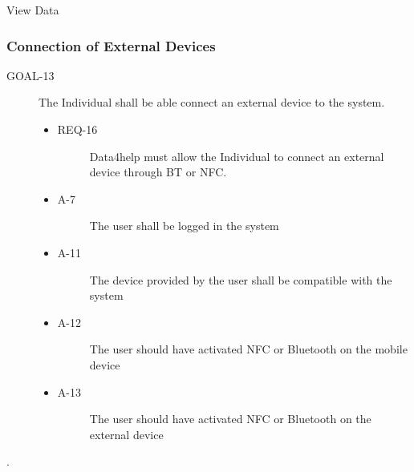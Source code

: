 \documentclass[a4paper]{article}
\newcommand{\requirement}{\ding{229}}%
\begin{document}
        
        \begin{usecase}{View Data}
        \end{usecase}
        
        
        
        \subsubsection{Connection of External Devices}

 \begin{description}
        	\item[GOAL-13] The Individual shall be able connect an external device to the system.
            	\begin{itemize}
            	    \item[\requirement]
                	\begin{description}
                	\item[REQ-16] Data4help must allow the Individual to connect an external device through BT or NFC.
                	\end{description}
                	\item
                	\begin{description}
                	\item[A-7] The user shall be logged in the system
                	\end{description}
                	\item
                	\begin{description}
                	\item[A-11] The device provided by the user shall be compatible with the system
                	\end{description}
                	\item
                	\begin{description}
                	\item[A-12] The user should have activated NFC or Bluetooth on the mobile device
                	\end{description}
                	\item
                	\begin{description}
                	\item[A-13] The user should have activated NFC or Bluetooth on the external device
                	\end{description}
                	\end{itemize}
        \end{description}.
        
\end{document}
